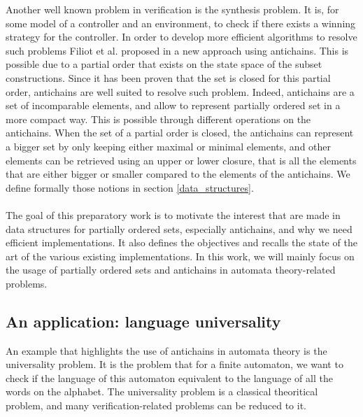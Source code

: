 \documentclass[11pt,a4paper]{article}
\theoremstyle{definition}
\begin{document}
Another well known problem in verification is the synthesis problem.
It is, for
some model of a controller and an environment,
to check if there exists a winning strategy for the controller.
In order to develop more efficient algorithms to resolve such
problems Filiot et al. proposed in \cite{ltl_rea} a new approach
using antichains.
This is possible due to a partial order that exists on the state
space of the subset constructions. Since it has been
proven that the set is closed for this partial order,
antichains are well suited to resolve such problem.
Indeed, antichains are a set of incomparable elements, and
allow to represent partially ordered set in a more compact way.
This is possible through different operations on the antichains.
When the set of a partial order is closed, the antichains
can represent a bigger set by only keeping
either maximal or minimal elements,
and other elements can be retrieved using an upper or lower closure,
that is all the elements that are either bigger or smaller
compared to the elements of the antichains.
We define formally
those notions in section \ref{data_structures}.

\paragraph{}

The goal of this preparatory work is to motivate the interest that
are made in data structures for partially ordered sets,
especially antichains,
and why we need efficient
implementations.
It also defines the objectives
and recalls the state of the art of the various existing implementations.
In this work, we will mainly focus
on the usage of partially ordered sets and antichains in
automata theory-related problems.

\subsection{An application: language universality}

An example that highlights the use of antichains in automata theory is
the universality problem.
It is the problem that for a finite automaton, we want to
check if the language of this automaton equivalent to the language
of all the words on the alphabet. The universality problem is a classical
theoritical problem, and many verification-related problems can be
reduced to it.

\paragraph{}
\end{document}
